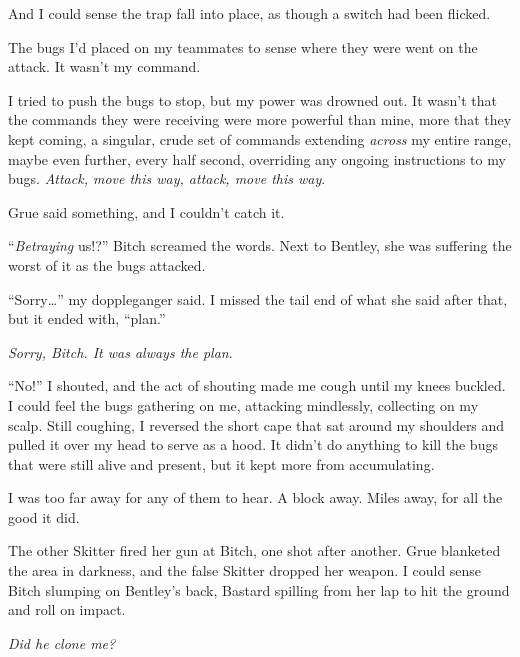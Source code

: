 And I could sense the trap fall into place, as though a switch had been flicked.



The bugs I'd placed on my teammates to sense where they were went on the attack.  It wasn't my command.



I tried to push the bugs to stop, but my power was drowned out.  It wasn't that the commands they were receiving were more powerful than mine, more that they kept coming, a singular, crude set of commands extending \emph{across }my entire range, maybe even further, every half second, overriding any ongoing instructions to my bugs.  \emph{Attack, move this way, attack, move this way}.



Grue said something, and I couldn't catch it.



``\emph{Betraying} us!?'' Bitch screamed the words.  Next to Bentley, she was suffering the worst of it as the bugs attacked.



``Sorry\ldots'' my doppleganger said.  I missed the tail end of what she said after that, but it ended with, ``\ldotsthe plan.''



\emph{Sorry, Bitch.  It was always the plan}.



``No!''  I shouted, and the act of shouting made me cough until my knees buckled.  I could feel the bugs gathering on me, attacking mindlessly, collecting on my scalp.  Still coughing, I reversed the short cape that sat around my shoulders and pulled it over my head to serve as a hood.  It didn't do anything to kill the bugs that were still alive and present, but it kept more from accumulating.



I was too far away for any of them to hear.  A block away.  Miles away, for all the good it did.



The other Skitter fired her gun at Bitch, one shot after another.  Grue blanketed the area in darkness, and the false Skitter dropped her weapon.  I could sense Bitch slumping on Bentley's back, Bastard spilling from her lap to hit the ground and roll on impact.



\emph{Did he clone me?}



